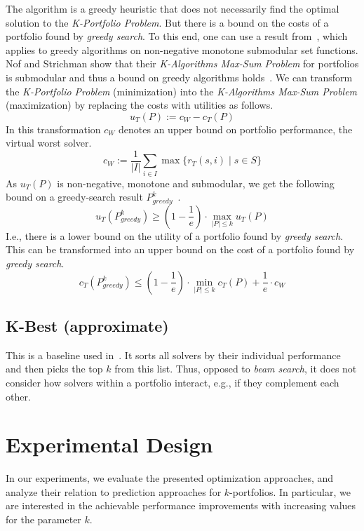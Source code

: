 \documentclass[conference]{IEEEtran}
\begin{document}
The algorithm is a greedy heuristic that does not necessarily find the optimal solution to the \emph{K-Portfolio Problem}. 
But there is a bound on the costs of a portfolio found by \emph{greedy search}. 
To this end, one can use a result from~\cite{nemhauser1978analysis}, which applies to greedy algorithms on non-negative monotone submodular set functions.
Nof and Strichman show that their \emph{K-Algorithms Max-Sum Problem} for portfolios is submodular and thus a bound on greedy algorithms holds~\cite{nof2020real}. 
We can transform the \emph{K-Portfolio Problem} (minimization) into the \emph{K-Algorithms Max-Sum Problem} (maximization) by replacing the costs with utilities as follows.%
$$
u_{T}(P) := c_W - c_{T}(P)
$$
In this transformation $c_W$ denotes an upper bound on portfolio performance, the virtual worst solver.%
$$
c_W := \frac{1}{|I|} \sum_{i \in I}{\max\{{r_T(s,i) \mid s \in S}}\}
$$
As $u_{T}(P)$ is non-negative, monotone and submodular, we get the following bound on a greedy-search result $P_{greedy}^k$~\cite{nemhauser1978analysis, krause2014submodular}.%
$$
	u_{T}(P_{greedy}^k) \geq (1 - \frac{1}{e}) \cdot \max_{|P| \leq k}{u_{T}(P)}
$$
I.e., there is a lower bound on the utility of a portfolio found by \emph{greedy search}.
This can be transformed into an upper bound on the cost of a portfolio found by \emph{greedy search}.%
\begin{equation}
	c_{T}(P_{greedy}^k) \leq (1 - \frac{1}{e}) \cdot \min_{|P| \leq k}{c_{T}(P)} + \frac{1}{e} \cdot c_W
	\label{eq:upper-bound}
\end{equation}

\subsection{K-Best (approximate)}

This is a baseline used in~\cite{nof2020real}.
It sorts all solvers by their individual performance and then picks the top $k$ from this list.
Thus, opposed to \emph{beam search}, it does not consider how solvers within a portfolio interact, e.g., if they complement each other.

\section{Experimental Design}
\label{sec:experimental-design}

In our experiments, we evaluate the presented optimization approaches, and analyze their relation to prediction approaches for $k$-portfolios. 
In particular, we are interested in the achievable performance improvements with increasing values for the parameter $k$. 
\end{document}
